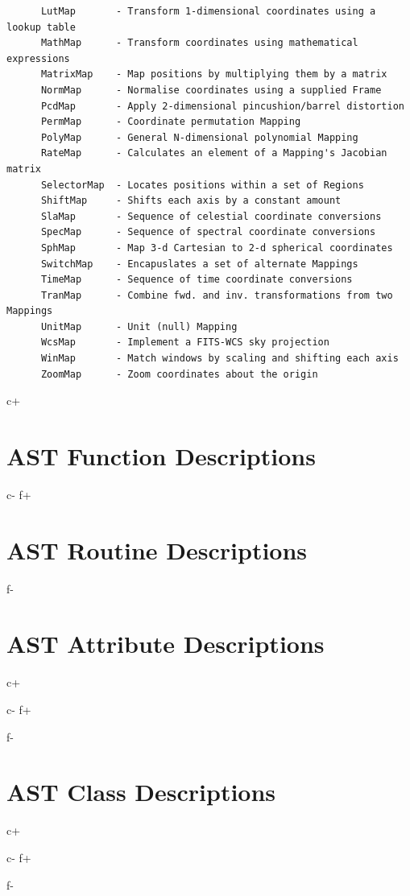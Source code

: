 \documentclass[twoside,11pt]{article}
\begin{document}
\begin{verbatim}
      LutMap       - Transform 1-dimensional coordinates using a lookup table
      MathMap      - Transform coordinates using mathematical expressions
      MatrixMap    - Map positions by multiplying them by a matrix
      NormMap      - Normalise coordinates using a supplied Frame
      PcdMap       - Apply 2-dimensional pincushion/barrel distortion
      PermMap      - Coordinate permutation Mapping
      PolyMap      - General N-dimensional polynomial Mapping
      RateMap      - Calculates an element of a Mapping's Jacobian matrix
      SelectorMap  - Locates positions within a set of Regions
      ShiftMap     - Shifts each axis by a constant amount
      SlaMap       - Sequence of celestial coordinate conversions
      SpecMap      - Sequence of spectral coordinate conversions
      SphMap       - Map 3-d Cartesian to 2-d spherical coordinates
      SwitchMap    - Encapuslates a set of alternate Mappings
      TimeMap      - Sequence of time coordinate conversions
      TranMap      - Combine fwd. and inv. transformations from two Mappings
      UnitMap      - Unit (null) Mapping
      WcsMap       - Implement a FITS-WCS sky projection
      WinMap       - Match windows by scaling and shifting each axis
      ZoomMap      - Zoom coordinates about the origin
\end{verbatim}
\normalsize

\cleardoublepage
c+
\section{\label{ss:functiondescriptions}AST Function Descriptions}
\small

\normalsize
c-
f+
\section{\label{ss:functiondescriptions}AST Routine Descriptions}
\small

\normalsize
f-

\cleardoublepage
\section{\label{ss:attributedescriptions}AST Attribute Descriptions}
\small
c+

c-
f+

f-
\normalsize

\cleardoublepage
\section{\label{ss:classdescriptions}AST Class Descriptions}
\small
c+

c-
f+

f-
\normalsize
\end{document}
